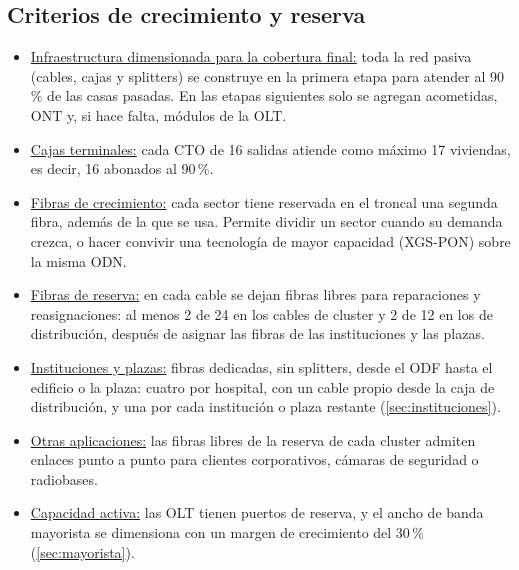 \subsection{Criterios de crecimiento y reserva}
\label{sec:crecimiento}
\begin{itemize}
    \item \underline{Infraestructura dimensionada para la cobertura final:} toda la red pasiva (cables, cajas y splitters) se construye en la primera etapa para atender al 90\,\% de las casas pasadas. En las etapas siguientes solo se agregan acometidas, ONT y, si hace falta, módulos de la OLT.
    \item \underline{Cajas terminales:} cada CTO de 16 salidas atiende como máximo 17 viviendas, es decir, 16 abonados al 90\,\%.
    \item \underline{Fibras de crecimiento:} cada sector tiene reservada en el troncal una segunda fibra, además de la que se usa. Permite dividir un sector cuando su demanda crezca, o hacer convivir una tecnología de mayor capacidad (XGS-PON) sobre la misma ODN.
    \item \underline{Fibras de reserva:} en cada cable se dejan fibras libres para reparaciones y reasignaciones: al menos 2 de 24 en los cables de cluster y 2 de 12 en los de distribución, después de asignar las fibras de las instituciones y las plazas.
    \item \underline{Instituciones y plazas:} fibras dedicadas, sin splitters, desde el ODF hasta el edificio o la plaza: cuatro por hospital, con un cable propio desde la caja de distribución, y una por cada institución o plaza restante (\autoref{sec:instituciones}).
    \item \underline{Otras aplicaciones:} las fibras libres de la reserva de cada cluster admiten enlaces punto a punto para clientes corporativos, cámaras de seguridad o radiobases.
    \item \underline{Capacidad activa:} las OLT tienen puertos de reserva, y el ancho de banda mayorista se dimensiona con un margen de crecimiento del 30\,\% (\autoref{sec:mayorista}).
\end{itemize}
